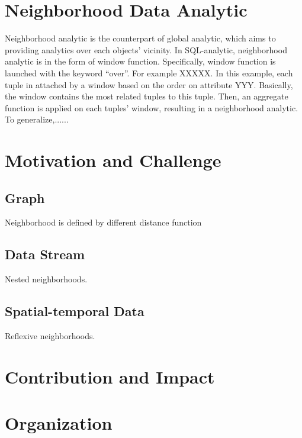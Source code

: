 \section{Neighborhood Data Analytic}
Neighborhood analytic is the counterpart of global analytic, which aims to providing analytics 
over each objects' vicinity. In SQL-analytic, neighborhood analytic is in the form of window function.
Specifically, window function is launched with the keyword ``over''. For example XXXXX. In this example,
each tuple in attached by a window based on the order on attribute YYY. Basically, the window contains
the most related tuples to this tuple. Then, an aggregate function is applied on each tuples' window, resulting
in a neighborhood analytic. To generalize,......

\section{Motivation and Challenge}
\subsection{Graph}
Neighborhood is defined by different distance function
\subsection{Data Stream}
Nested neighborhoods.
\subsection{Spatial-temporal Data}
Reflexive neighborhoods.
\section{Contribution and Impact}

\section{Organization}